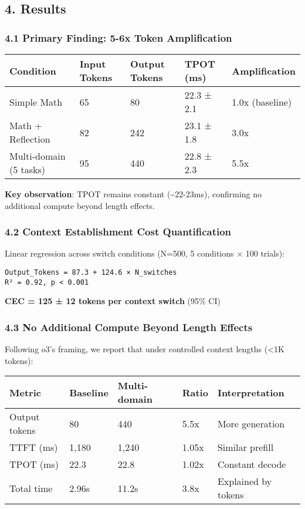 \documentclass[
  11pt]{article}
\begin{document}
\subsection{4. Results}\label{results}

\subsubsection{4.1 Primary Finding: 5-6x Token
Amplification}\label{primary-finding-5-6x-token-amplification}

\begin{longtable}[]{@{}lllll@{}}
\toprule\noalign{}
Condition & Input Tokens & Output Tokens & TPOT (ms) & Amplification \\
\midrule\noalign{}
\endhead
\bottomrule\noalign{}
\endlastfoot
Simple Math & 65 & 80 & 22.3 ± 2.1 & 1.0x (baseline) \\
Math + Reflection & 82 & 242 & 23.1 ± 1.8 & 3.0x \\
Multi-domain (5 tasks) & 95 & 440 & 22.8 ± 2.3 & 5.5x \\
\end{longtable}

\textbf{Key observation}: TPOT remains constant
(\textasciitilde22-23ms), confirming no additional compute beyond length
effects.

\subsubsection{4.2 Context Establishment Cost
Quantification}\label{context-establishment-cost-quantification}

Linear regression across switch conditions (N=500, 5 conditions × 100
trials):

\begin{verbatim}
Output_Tokens = 87.3 + 124.6 × N_switches
R² = 0.92, p < 0.001
\end{verbatim}

\textbf{CEC = 125 ± 12 tokens per context switch} (95\% CI)

\subsubsection{4.3 No Additional Compute Beyond Length
Effects}\label{no-additional-compute-beyond-length-effects}

Following o3's framing, we report that under controlled context lengths
(\textless1K tokens):

\begin{longtable}[]{@{}lllll@{}}
\toprule\noalign{}
Metric & Baseline & Multi-domain & Ratio & Interpretation \\
\midrule\noalign{}
\endhead
\bottomrule\noalign{}
\endlastfoot
Output tokens & 80 & 440 & 5.5x & More generation \\
TTFT (ms) & 1,180 & 1,240 & 1.05x & Similar prefill \\
TPOT (ms) & 22.3 & 22.8 & 1.02x & Constant decode \\
Total time & 2.96s & 11.2s & 3.8x & Explained by tokens \\
\end{longtable}
\end{document}
